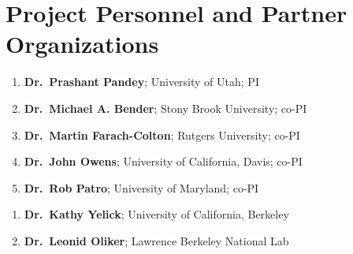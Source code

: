 
\section*{Project Personnel and Partner Organizations}
\vspace{0.1in}
\noindent
\begin{enumerate}
\item \textbf{Dr.\ Prashant Pandey}; University of Utah; PI
\item \textbf{Dr.\ Michael A. Bender}; Stony Brook University; co-PI
\item \textbf{Dr.\ Martin Farach-Colton}; Rutgers University; co-PI
\item \textbf{Dr.\ John Owens}; University of California, Davis; co-PI
\item \textbf{Dr.\ Rob Patro}; University of 
Maryland; co-PI
\end{enumerate}
\vspace{3mm}
\begin{enumerate}
\item \textbf{Dr.\ Kathy Yelick}; University of California, Berkeley
\item \textbf{Dr.\ Leonid Oliker}; Lawrence Berkeley National Lab
\end{enumerate}
